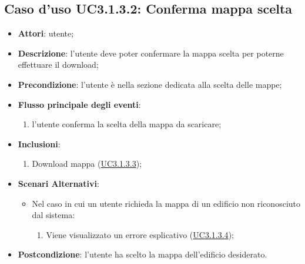 \documentclass[../AnalisiDeiRequisiti.tex]{subfiles}
\begin{document}
\subsection{Caso d'uso UC3.1.3.2: Conferma mappa scelta}
\begin{itemize}
\item \textbf{Attori}: utente;
\item \textbf{Descrizione}: l'utente deve poter confermare la mappa scelta per poterne effettuare il download; 
      \item \textbf{Precondizione}: l'utente è nella sezione dedicata alla scelta delle mappe;

        \item \textbf{Flusso principale degli eventi}:
          \begin{enumerate}
          \item l'utente conferma la scelta della mappa da scaricare;        

      \end{enumerate}
    \item \textbf{Inclusioni}:
      \begin{enumerate}
          \item Download mappa (\hyperlink{UC3.1.3.3}{UC3.1.3.3});

      \end{enumerate}
    \item \textbf{Scenari Alternativi}:
      \begin{itemize}
      	  \item Nel caso in cui un utente richieda la mappa di un edificio non riconosciuto dal sistema:
	      \begin{enumerate}
	          \item Viene visualizzato un errore esplicativo (\hyperlink{UC3.1.3.4}{UC3.1.3.4});
	      \end{enumerate}
	  \end{itemize}
    \item \textbf{Postcondizione}: l'utente ha scelto la mappa dell'edificio desiderato.
  \end{itemize}
\hypertarget{UC3.1.3.3}{}
\end{document}
